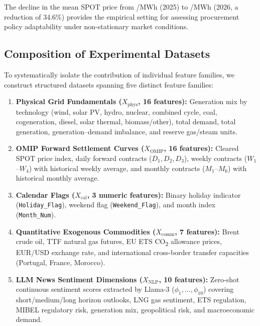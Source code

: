 The decline in the mean SPOT price from /MWh (2025) to /MWh (2026, a reduction of 34.6\%) provides the empirical setting for assessing procurement policy adaptability under non-stationary market conditions.

\subsection{Composition of Experimental Datasets}
\label{subsec:dataset_composition}

To systematically isolate the contribution of individual feature families, we construct structured datasets spanning five distinct feature families:
\begin{enumerate}
    \item \textbf{Physical Grid Fundamentals ($X_{\text{phys}}$, 16 features):} Generation mix by technology (wind, solar PV, hydro, nuclear, combined cycle, coal, cogeneration, diesel, solar thermal, biomass/other), total demand, total generation, generation--demand imbalance, and reserve gas/steam units.
    \item \textbf{OMIP Forward Settlement Curves ($X_{\text{OMIP}}$, 16 features):} Cleared SPOT price index, daily forward contracts ($D_1, D_2, D_3$), weekly contracts ($W_1$--$W_4$) with historical weekly average, and monthly contracts ($M_1$--$M_6$) with historical monthly average.
    \item \textbf{Calendar Flags ($X_{\text{cal}}$, 3 numeric features):} Binary holiday indicator (\texttt{Holiday\_Flag}), weekend flag (\texttt{Weekend\_Flag}), and month index (\texttt{Month\_Num}).
    \item \textbf{Quantitative Exogenous Commodities ($X_{\text{comm}}$, 7 features):} Brent crude oil, TTF natural gas futures, EU ETS CO\textsubscript{2} allowance prices, EUR/USD exchange rate, and international cross-border transfer capacities (Portugal, France, Morocco).
    \item \textbf{LLM News Sentiment Dimensions ($X_{\text{NLP}}$, 10 features):} Zero-shot continuous sentiment scores extracted by Llama-3 ($\phi_1, \dots, \phi_{10}$) covering short/medium/long horizon outlooks, LNG gas sentiment, ETS regulation, MIBEL regulatory risk, generation mix, geopolitical risk, and macroeconomic demand.
\end{enumerate}

